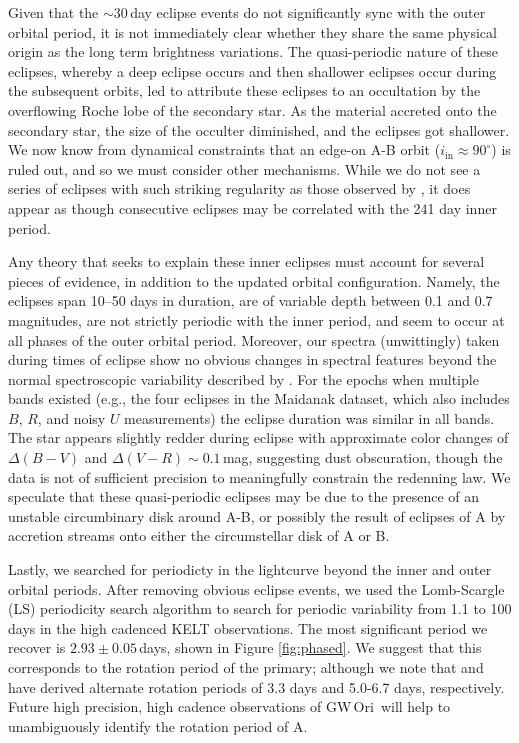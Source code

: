 \documentclass[twocolumn]{aastex61}
\newcommand{\obj}{GW\,Ori}
\begin{document}
Given that the $\sim$30\,day eclipse events do not significantly sync with the outer orbital period, it is not immediately clear whether they share the same physical origin as the long term brightness variations. The quasi-periodic nature of these eclipses, whereby a deep eclipse occurs and then shallower eclipses occur during the subsequent orbits, led \citet{shevchenko98} to attribute these eclipses to an occultation by the overflowing Roche lobe of the secondary star. As the material accreted onto the secondary star, the size of the occulter diminished, and the eclipses got shallower. We now know from dynamical constraints that an edge-on A-B orbit ($i_\mathrm{in} \approx 90^\circ$) is ruled out, and so we must consider other mechanisms. While we do not see a series of eclipses with such striking regularity as those observed by \citet{shevchenko98}, it does appear as though consecutive eclipses may be correlated with the 241 day inner period.

Any theory that seeks to explain these inner eclipses must account for several pieces of evidence, in addition to the updated orbital configuration. Namely, the eclipses span 10--50 days in duration, are of variable depth between 0.1 and 0.7 magnitudes, are not strictly periodic with the inner period, and seem to occur at all phases of the outer orbital period. Moreover, our spectra (unwittingly) taken during times of eclipse show no obvious changes in spectral features beyond the normal spectroscopic variability described by \citet{fang14}. For the epochs when multiple bands existed (e.g., the four eclipses in the Maidanak dataset, which also includes $B$, $R$, and noisy $U$ measurements) the eclipse duration was similar in all bands. The star appears slightly redder during eclipse with approximate color changes of $\Delta (B - V)$ and $\Delta (V - R) \sim 0.1$\,mag, suggesting dust obscuration, though the data is not of sufficient precision to meaningfully constrain the redenning law. We speculate that these quasi-periodic eclipses may be due to the presence of an unstable circumbinary disk around A-B, or possibly the result of eclipses of A by accretion streams onto either the circumstellar disk of A or B.

Lastly, we searched for periodicty in the lightcurve beyond the inner and outer orbital periods.
After removing obvious eclipse events, we used the Lomb-Scargle (LS) periodicity search algorithm \citep{lomb76,scargle82}  \citep[within the VARTOOLS analysis package;][]{hartman16} to search for periodic variability from 1.1 to 100 days in the high cadenced KELT observations. The most significant period we recover is $2.93 \pm 0.05$\,days, shown in Figure \ref{fig:phased}. We suggest that this corresponds to the rotation period of the primary; although we note that \citet{bouvier90} and \citet{fang14} have derived alternate rotation periods of 3.3 days and 5.0-6.7 days, respectively. Future high precision, high cadence observations of \obj\ will help to unambiguously identify the rotation period of A.
\end{document}
